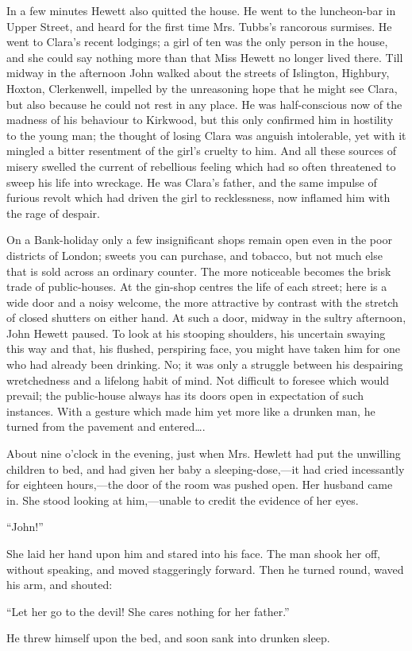 In a few minutes Hewett also quitted the house. He went to the
luncheon-bar in Upper Street, and heard for the first time Mrs. Tubbs's
rancorous surmises. He went to Clara's recent lodgings; a girl of ten
was the only person in the house, and she could say nothing more than
that Miss Hewett no longer lived there. Till midway in the afternoon
John walked about the streets of Islington, Highbury, Hoxton,
Clerkenwell, impelled by the unreasoning hope that he might see Clara,
but also because he could not rest in any place. He was half-conscious
now of the madness of his behaviour to Kirkwood, but this only confirmed
him in hostility to the {}young man; the thought of losing Clara was
anguish intolerable, yet with it mingled a bitter resentment of the
girl's cruelty to him. And all these sources of misery swelled the
current of rebellious feeling which had so often threatened to sweep his
life into wreckage. He was Clara's father, and the same impulse of
furious revolt which had driven the girl to recklessness, now inflamed
him with the rage of despair.

On a Bank-holiday only a few insignificant shops remain open even in the
poor districts of London; sweets you can purchase, and tobacco, but not
much else that is sold across an ordinary counter. The more noticeable
becomes the brisk trade of public-houses. At the gin-shop centres the
life of each street; here is a wide door and a noisy welcome, the more
attractive by contrast with the stretch of closed shutters on either
hand. At such a door, midway in the sultry afternoon, John Hewett
paused. To look at his stooping shoulders, his uncertain swaying this
way and that, his flushed, perspiring face, you might {}have taken him
for one who had already been drinking. No; it was only a struggle
between his despairing wretchedness and a lifelong habit of mind. Not
difficult to foresee which would prevail; the public-house always has
its doors open in expectation of such instances. With a gesture which
made him yet more like a drunken man, he turned from the pavement and
entered\ldots{}.

About nine o'clock in the evening, just when Mrs. Hewlett had put the
unwilling children to bed, and had given her baby a sleeping-dose,---it
had cried incessantly for eighteen hours,---the door of the room was
pushed open. Her husband came in. She stood looking at him,---unable to
credit the evidence of her eyes.

``John!''

She laid her hand upon him and stared into his face. The man shook her
off, without speaking, and moved staggeringly forward. Then he turned
round, waved his arm, and shouted:

{}``Let her go to the devil! She cares nothing for her father.''

He threw himself upon the bed, and soon sank into drunken sleep.
